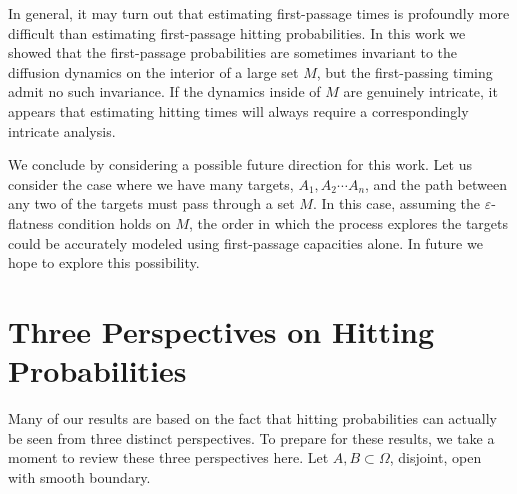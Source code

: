 \documentclass[12pt, nofootinbib,english, amsmath, amssymb, aps, priprint, graphicx,floatfix]{revtex4-1}
\theoremstyle{plain}
\theoremstyle{definition}
\theoremstyle{plain}
\begin{document}
In general, it may turn out that estimating first-passage times is profoundly more difficult than estimating first-passage hitting probabilities.  In this work we showed that the first-passage probabilities are sometimes invariant to the diffusion dynamics on the interior of a large set $M$, but the first-passing timing admit no such invariance.   If the dynamics inside of $M$ are genuinely intricate, it appears that estimating hitting times will always require a correspondingly intricate analysis.  

We conclude by considering a possible future direction for this work.  Let us consider the case where we have many targets, $A_1,A_2\cdots A_n$, and the path between any two of the targets must pass through a set $M$.  In this case, assuming the $\varepsilon$-flatness condition holds on $M$, the order in which the process explores the targets could be accurately modeled using first-passage capacities alone.  In future we hope to explore this possibility.

\newpage
\appendix
{}


                                                         
\section{Three Perspectives on Hitting Probabilities}
\label{sec:three_perspectives}

Many of our results are based on the fact that hitting probabilities can actually be seen from three distinct perspectives.  To prepare for these results, we take a moment to review these three perspectives here.  Let $A,B\subset \Omega$, disjoint, open with smooth boundary.  
\end{document}
